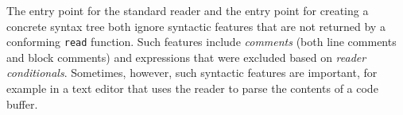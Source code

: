 The entry point for the standard reader and the entry point for
creating a concrete syntax tree both ignore syntactic features that
are not returned by a conforming \texttt{read} function.  Such
features include \emph{comments} (both line comments and block
comments) and expressions that were excluded based on \emph{reader
  conditionals}.  Sometimes, however, such syntactic features are
important, for example in a text editor that uses the reader to parse
the contents of a \commonlisp{} code buffer.
